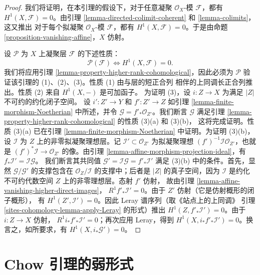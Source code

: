 \begin{proof}
我们将证明，在本引理的假设下，对于任意凝聚 $\mathcal{O}_X$-模
$\mathcal{F}$，都有 $H^1(X, \mathcal{F}) = 0$。由引理
\ref{lemma-directed-colimit-coherent} 和 \ref{lemma-colimits}，这又推出
对于每个拟凝聚 $\mathcal{O}_X$-模 $\mathcal{F}$，都有
$H^1(X, \mathcal{F}) = 0$。于是由命题
\ref{proposition-vanishing-affine}，$X$ 仿射。

\medskip\noindent
设 $\mathcal{P}$ 为 $X$ 上凝聚层 $\mathcal{F}$ 的下述性质：
$$
\mathcal{P}(\mathcal{F}) \Leftrightarrow H^1(X, \mathcal{F}) = 0.
$$
我们将应用引理 \ref{lemma-property-higher-rank-cohomological}，因此必须为
$\mathcal{P}$ 验证该引理的 (1)、(2)、(3)。性质 (1) 由与层的短正合列
相伴的上同调长正合列推出。性质 (2) 来自 $H^1(X, -)$ 是可加函子。
为证明 (3)，设 $i : Z \to X$ 为满足 $|Z|$ 不可约的约化闭子空间。
设 $i' : Z' \to Y$ 和 $f' : Z' \to Z$ 如引理
\ref{lemma-finite-morphism-Noetherian} 中所述，并令
$\mathcal{G} = f'_*\mathcal{O}_{Z'}$。我们断言 $\mathcal{G}$ 满足引理
\ref{lemma-property-higher-rank-cohomological} 的性质 (3)(a) 和 (3)(b)，
这将完成证明。性质 (3)(a) 已在引理
\ref{lemma-finite-morphism-Noetherian} 中证明。为证明 (3)(b)，设
$\mathcal{I}$ 为 $Z$ 上的非零拟凝聚理想层。记
$\mathcal{I}' \subset \mathcal{O}_{Z'}$ 为拟凝聚理想
$(f')^{-1}\mathcal{I} \mathcal{O}_{Z'}$，也就是
$(f')^*\mathcal{I} \to \mathcal{O}_{Z'}$ 的像。由引理
\ref{lemma-affine-morphism-projection-ideal}，有
$f_*\mathcal{I}' = \mathcal{I} \mathcal{G}$。%
我们断言其共同值
$\mathcal{G}' = \mathcal{I} \mathcal{G} = f'_*\mathcal{I}'$
满足 (3)(b) 中的条件。首先，显然 $\mathcal{G}/\mathcal{G}'$ 的支撑包含在
$\mathcal{O}_Z/\mathcal{I}$ 的支撑中；后者是 $|Z|$ 的真子空间，因为
$\mathcal{I}$ 是约化不可约代数空间 $Z$ 上的非零理想层。态射 $f'$ 仿射，
故由引理 \ref{lemma-affine-vanishing-higher-direct-images}，
$R^1f'_*\mathcal{I}' = 0$。由于 $Z'$ 仿射（它是仿射概形的闭子概形），
有 $H^1(Z', \mathcal{I}') = 0$。因此 Leray 谱序列（取《站点上的上同调》
引理 \ref{sites-cohomology-lemma-apply-Leray} 的形式）推出
$H^1(Z, f'_*\mathcal{I}') = 0$。由于 $i : Z \to X$ 仿射，
$R^1i_*f'_*\mathcal{I}' = 0$；再次应用 Leray，得到
$H^1(X, i_*f'_*\mathcal{I}') = 0$。换言之，如所要求，有
$H^1(X, i_*\mathcal{G}') = 0$。
\end{proof}








\section{Chow 引理的弱形式}
\label{section-weak-chow}

